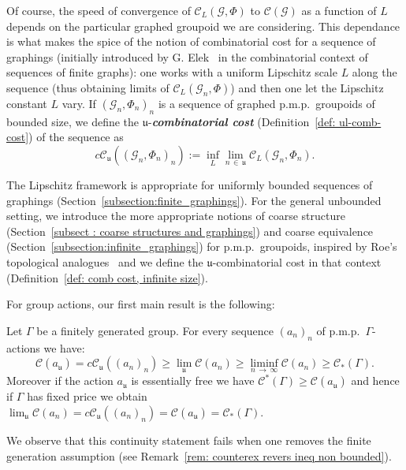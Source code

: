 \documentclass[AHL,Unicode,longabstracts,published]{cedram}
\newcommand{\defin}[1]{\textbf{\emph{#1}}}
\newcommand{\cost}{\mathcal{C}}
\newcommand{\ccost}{c\mathcal{C}}
\newcommand{\cg}{\mathcal{G}}
\newcommand{\vraicost}{\mathscr{C}}
\newcommand{\ul}{\mathfrak{u}}
\newcommand{\pmp}{p.m.p.\ }
\begin{document}
Of course, the speed of convergence of $\cost_L(\cg,\Phi)$ to $\cost(\cg)$ as a function of $L$ depends on the particular graphed groupoid we are considering. This dependance is what makes the spice of the notion of combinatorial cost for a sequence of graphings (initially introduced by G. Elek~\cite{Elek-combinatorial-cost-2007} in the combinatorial context of sequences of finite graphs): one works with a uniform Lipschitz scale $L$ along the sequence (thus obtaining limits of $\cost_L(\cg_n,\Phi)$) and then one let the Lipschitz constant $L$ vary. If $(\cg_n,\Phi_n)_n$ is a sequence of graphed \pmp groupoids of bounded size, we define the $\ul$-\defin{combinatorial cost} (Definition~\ref{def: ul-comb-cost}) of the sequence as
\[
\ccost_\ul\left(\left(\cg_n,\Phi_n\right)_n\right):=\inf_L\lim_{n\,\in\,\ul}\cost_L\left(\cg_n,\Phi_n\right).
\]

The Lipschitz framework is appropriate for uniformly bounded sequences of graphings (Section~\ref{subsection:finite_graphings}). For the general unbounded setting, we introduce the more appropriate notions of coarse structure (Section~\ref{subsect : coarse structures and graphings}) and coarse equivalence (Section~\ref{subsection:infinite_graphings}) for \pmp groupoids, inspired by Roe's topological analogues~\cite{Roe-2003} and we define the $\ul$-combinatorial cost in that context (Definition~\ref{def: comb cost, infinite size}).



For group actions, our first main result is the following:
\begin{theo}\label{th-intro:equality of lim cost for fixed price}
Let $\Gamma$ be a finitely generated group. For every sequence $(a_n)_n$ of \pmp $\Gamma$-actions we have:
\begin{equation}
\cost(a_\ul)=\ccost_\ul\left((a_n)_n\right) \geq \lim_{\ul}\cost(a_{n})\geq \liminf_{n\,\to\,\infty}\cost(a_{n}) \geq \vraicost_*(\Gamma).
\end{equation}
Moreover if the action $a_\ul$ is essentially free we have $\vraicost^*(\Gamma)\geq \cost(a_\ul)$ and hence if $\Gamma$ has fixed price we obtain $\lim_\ul\cost(a_n)=\ccost_\ul((a_n)_n)=\cost(a_{\ul})=\vraicost_*(\Gamma)$.
\end{theo}

We observe that this continuity statement fails when one removes the finite generation assumption (see Remark~\ref{rem: counterex revers ineq non bounded}).
\end{document}
